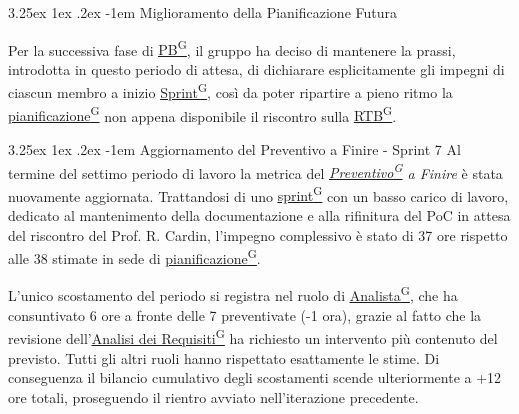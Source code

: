 \documentclass[a4paper,12pt]{article}
\makeatletter
\renewcommand\paragraph{\@startsection{paragraph}{5}{\z@}%
  {3.25ex \@plus1ex \@minus.2ex}%
  {-1em}%
  {\normalfont\normalsize\bfseries}}
\providecommand{\glslink}[2]{\href{https://alittlebyte-19.github.io/Documentazione/glossario.html\#gls-#1}{\underline{#2}\textsuperscript{\scriptsize G}}}
\makeatother
\begin{document}
\paragraph{Miglioramento della Pianificazione Futura}

Per la successiva fase di \glslink{pb-product-baseline}{PB}, il gruppo ha deciso di mantenere la prassi, introdotta in questo periodo di attesa, di dichiarare esplicitamente gli impegni di ciascun membro a inizio \glslink{sprint}{Sprint}, così da poter ripartire a pieno ritmo la \glslink{pianificazione}{pianificazione} non appena disponibile il riscontro sulla \glslink{rtb-requirements-and-technology-baseline}{RTB}.


\paragraph{Aggiornamento del Preventivo a Finire - Sprint 7}
Al termine del settimo periodo di lavoro la metrica del \textit{\glslink{preventivo}{Preventivo} a Finire} è stata nuovamente aggiornata. Trattandosi di uno \glslink{sprint}{sprint} con un basso carico di lavoro, dedicato al mantenimento della documentazione e alla rifinitura del PoC in attesa del riscontro del Prof. R. Cardin, l'impegno complessivo è stato di 37 ore rispetto alle 38 stimate in sede di \glslink{pianificazione}{pianificazione}.

L'unico scostamento del periodo si registra nel ruolo di \glslink{analista}{Analista}, che ha consuntivato 6 ore a fronte delle 7 preventivate (-1 ora), grazie al fatto che la revisione dell'\glslink{analisi-dei-requisiti-adr}{Analisi dei Requisiti} ha richiesto un intervento più contenuto del previsto. Tutti gli altri ruoli hanno rispettato esattamente le stime. Di conseguenza il bilancio cumulativo degli scostamenti scende ulteriormente a +12 ore totali, proseguendo il rientro avviato nell'iterazione precedente.
\end{document}
